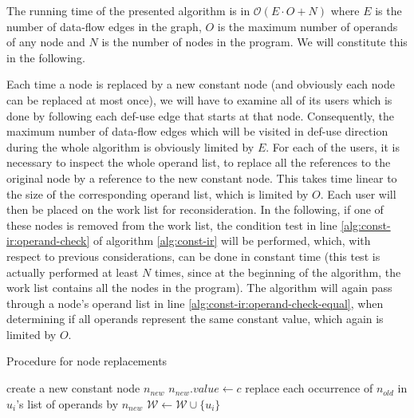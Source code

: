 The running time of the presented algorithm is in $\mathcal{O}(E\cdot O + N)$ where $E$ is the number of data-flow edges in the graph, $O$ is the maximum number of operands of any node and $N$ is the number of nodes in the program. We will constitute this in the following.

Each time a node is replaced by a new constant node (and obviously each node can be replaced at most once), we will have to examine all of its users which is done by following each def-use edge that starts at that node. Consequently, the maximum number of data-flow edges which will be visited in def-use direction during the whole algorithm is obviously limited by $E$. For each of the users, it is necessary to inspect the whole operand list, to replace all the references to the original node by a reference to the new constant node. This takes time linear to the size of the corresponding operand list, which is limited by $O$. Each user will then be placed on the work list for reconsideration.
In the following, if one of these nodes is removed from the work list, the condition test in line \ref{alg:const-ir:operand-check} of algorithm \ref{alg:const-ir} will be performed, which, with respect to previous considerations, can be done in constant time (this test is actually performed at least $N$ times, since at the beginning of the algorithm, the work list contains all the nodes in the program).
The algorithm will again pass through a node's operand list in line \ref{alg:const-ir:operand-check-equal}, when determining if all operands represent the same constant value, which again is limited by $O$.

\begin{algorithm}[t]
\caption{Procedure for node replacements}
\label{alg:const-ir-replace}
\begin{algorithmic}[1]
	\State create a new constant node $n_{\mathit{new}}$\label{alg:cont-ir:create-const}
	\State $n_{\mathit{new}}.\mathit{value} \gets c$\label{alg:const-ir:cont-init}
	\label{alg:const-ir:for-loop-users}
		\State replace each occurrence of $n_{old}$ in $u_i$'s list of operands by $n_{\mathit{new}}$\label{alg:const-ir:replace-operand}
		\State $\mathcal{W} \gets \mathcal{W} \cup \lbrace u_i\rbrace$\label{alg:const-ir:worklist-insert}
	\EndFor
\EndProcedure
\end{algorithmic}
\end{algorithm}
